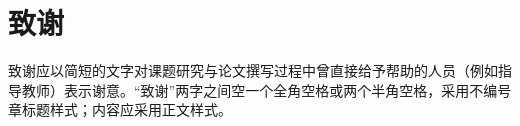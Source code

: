 \chapter{\texorpdfstring{致\quad 谢}{致谢}} %

致谢应以简短的文字对课题研究与论文撰写过程中曾直接给予帮助的人员（例如指导教师）表示谢意。“致谢”两字之间空一个全角空格或两个半角空格，采用不编号章标题样式；内容应采用正文样式。

\clearpage